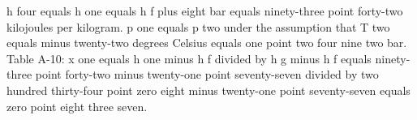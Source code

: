 h four equals h one equals h f plus eight bar equals ninety-three point forty-two kilojoules per kilogram.  
p one equals p two under the assumption that T two equals minus twenty-two degrees Celsius equals one point two four nine two bar.  
Table A-10: x one equals h one minus h f divided by h g minus h f equals ninety-three point forty-two minus twenty-one point seventy-seven divided by two hundred thirty-four point zero eight minus twenty-one point seventy-seven equals zero point eight three seven.